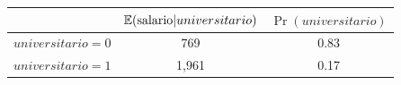 
\begin{tabular}[t]{rcc}
\toprule
 & $\operatorname{\mathbb{E}}(\text{salario}|universitario)$ & $\Pr(universitario)$\\
\midrule
$universitario = 0$ & 769 & 0.83\\
$universitario = 1$ & 1,961 & 0.17\\
\bottomrule
\end{tabular}
